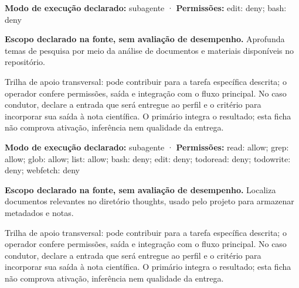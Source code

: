 \begin{arquitetura}
\textbf{Modo de execução declarado:} subagente · \textbf{Permissões:} edit: deny; bash: deny
\end{arquitetura}


\begin{descricao}
\textbf{Escopo declarado na fonte, sem avaliação de desempenho.}
Aprofunda temas de pesquisa por meio da análise de documentos e materiais disponíveis no repositório.
\end{descricao}

\begin{funcao}
Trilha de apoio transversal: pode contribuir para a tarefa específica descrita; o operador confere permissões, saída e integração com o fluxo principal. No caso condutor, declare a entrada que será entregue ao perfil e o critério para incorporar sua saída à nota científica. O primário integra o resultado; esta ficha não comprova ativação, inferência nem qualidade da entrega.
\end{funcao}

\begin{arquitetura}
\textbf{Modo de execução declarado:} subagente · \textbf{Permissões:} read: allow; grep: allow; glob: allow; list: allow; bash: deny; edit: deny; todoread: deny; todowrite: deny; webfetch: deny
\end{arquitetura}


\begin{descricao}
\textbf{Escopo declarado na fonte, sem avaliação de desempenho.}
Localiza documentos relevantes no diretório thoughts, usado pelo projeto para armazenar metadados e notas.
\end{descricao}

\begin{funcao}
Trilha de apoio transversal: pode contribuir para a tarefa específica descrita; o operador confere permissões, saída e integração com o fluxo principal. No caso condutor, declare a entrada que será entregue ao perfil e o critério para incorporar sua saída à nota científica. O primário integra o resultado; esta ficha não comprova ativação, inferência nem qualidade da entrega.
\end{funcao}

